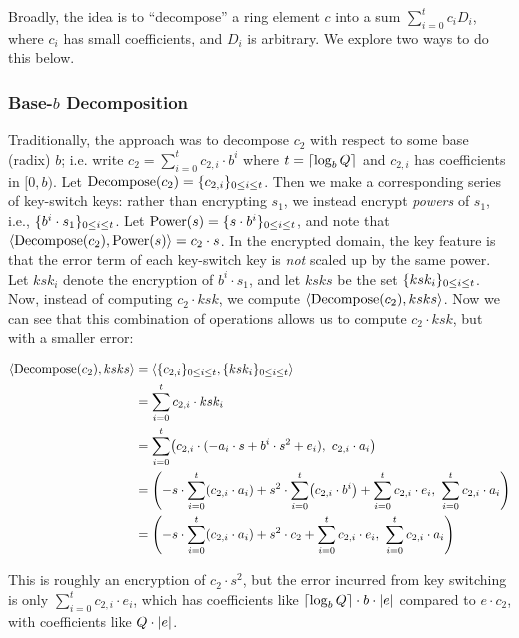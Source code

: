 \documentclass[../../fheimpl.tex]{subfiles}
\begin{document}
Broadly, the idea is to ``decompose'' a ring element $c$ into a sum $\sum_{i=0}^t c_i D_i$, where $c_i$ has small coefficients, and $D_i$ is arbitrary. We explore two ways to do this below.

\subsubsection{Base-$b$ Decomposition}
Traditionally, the approach was to decompose $c_2$ with respect to some base (radix) $b$; i.e. write $c_2 = \sum_{i=0}^t c_{2,i}\cdot b^i$ where $t=\lceil\log_b{Q}\rceil$ and $c_{2,i}$ has coefficients in $[0,b)$. Let $\mathrm{Decompose}(c_2) = \{c_{2,i}\}_{0\le i\le t}$. Then we make a corresponding series of key-switch keys: rather than encrypting $s_1$, we instead encrypt \emph{powers} of $s_1$, i.e., $\{b^i\cdot s_1\}_{0\le i \le t}$. Let $\mathrm{Power}(s)=\{s\cdot b^i\}_{0\le i\le t}$, and note that $\langle\mathrm{Decompose}(c_2), \mathrm{Power}(s)\rangle = c_2\cdot s$. In the encrypted domain, the key feature is that the error term of each key-switch key is \emph{not} scaled up by the same power. Let $ksk_i$ denote the encryption of $b^i\cdot s_1$, and let $ksks$ be the set $\{ksk_i\}_{0\le i\le t}$. Now, instead of computing $c_2\cdot ksk$, we compute $\langle\mathrm{Decompose}(c_2), ksks\rangle$. Now we can see that this combination of operations allows us to compute $c_2\cdot ksk$, but with a smaller error:

\begin{align*}
	\inner{\mathrm{Decompose}(c_2), ksks} &= \inner{\set{c_{2,i}}_{0\le i\le t}, \set{ksk_i}_{0\le i\le t}} \\
	&= \sum_{i=0}^t c_{2,i}\cdot ksk_i \\
	&= \sum_{i=0}^t \parens*{c_{2,i}\cdot({-a_i}\cdot s + b^i\cdot s^2 + e_i),\ c_{2,i}\cdot a_i} \\
	&= \parens*{-s\cdot \sum_{i=0}^t \parens*{c_{2,i}\cdot a_i} + s^2\cdot \sum_{i=0}^t \parens*{c_{2,i}\cdot b^i} + \sum_{i=0}^t c_{2,i}\cdot e_i,\ \sum_{i=0}^t c_{2,i}\cdot a_i} \\
	&= \parens*{-s\cdot \sum_{i=0}^t \parens*{c_{2,i}\cdot a_i} + s^2\cdot c_2 + \sum_{i=0}^t c_{2,i}\cdot e_i,\ \sum_{i=0}^t c_{2,i}\cdot a_i}
\end{align*}

This is roughly an encryption of $c_{2}\cdot s^2$, but the error incurred from key switching is only $\sum_{i=0}^t c_{2,i}\cdot e_i$, which has coefficients like $\lceil\log_b{Q}\rceil\cdot b\cdot \lvert e\rvert$ compared to $e\cdot c_2$, with coefficients like $Q\cdot \lvert e\rvert$.
\end{document}
